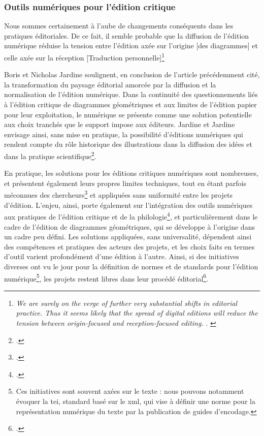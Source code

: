         \subsubsection{Outils numériques pour l'édition critique}
		\begin{displayquote}
			Nous sommes certainement à l'aube de changements conséquents dans les pratiques éditoriales. De ce fait, il semble probable que la diffusion de l'édition numérique réduise la tension entre l'édition axée sur l'origine [des diagrammes] et celle axée sur la réception [Traduction personnelle]\footnote{\textit{\og 			We are surely on the verge of further very substantial shifts in editorial practice. Thus it seems likely that the spread of digital editions will reduce the tension between origin-focused and reception-focused editing. \fg}. \cite{jardineCriticalEditingEarlyModern2010}}
		\end{displayquote}
	
		Boris et Nicholas Jardine soulignent, en conclusion de l'article précédemment cité, la transformation du paysage éditorial amorcée par la diffusion et la normalisation de l'édition numérique. Dans la continuité des questionnements liés à l'édition critique de diagrammes géométriques et aux limites de l'édition papier pour leur exploitation, le numérique se présente comme une solution potentielle aux choix tranchés que le support impose aux éditeurs. Jardine et Jardine envisage ainsi, sans mise en pratique, la possibilité d'éditions numériques qui rendent compte du rôle historique des illustrations dans la diffusion des idées et dans la pratique scientifique\footcite{jardineCriticalEditingEarlyModern2010}.
		
		En pratique, les solutions pour les éditions critiques numériques sont nombreuses, et présentent également leurs propres limites techniques, tout en étant parfois méconnues des chercheurs\footcite{apollonDigitalCriticalEditions2014} et appliquées sans uniformité entre les projets d'édition. L'enjeu, ainsi, porte également sur l'intégration des outils numériques aux pratiques de l'édition critique et de la philologie\footcite{apollonDigitalCriticalEditions2014}, et particulièrement dans le cadre de l'édition de diagrammes géométriques, qui se développe à l'origine dans un cadre peu défini. Les solutions appliquées, sans universalité, dépendent ainsi des compétences et pratiques des acteurs des projets, et les choix faits en termes d'outil varient profondément d'une édition à l'autre. Ainsi, si des initiatives diverses ont vu le jour pour la définition de normes et de standards pour l'édition numérique\footnote{Ces initiatives sont souvent axées sur le texte : nous pouvons notamment évoquer la \acrfull{tei}, standard basé sur le \acrshort{xml}, qui vise à définir une norme pour la représentation numérique du texte par la publication de guides d'encodage.}, les projets restent libres dans leur procédé éditorial\footcite{apollonDigitalCriticalEditions2014}.
		
